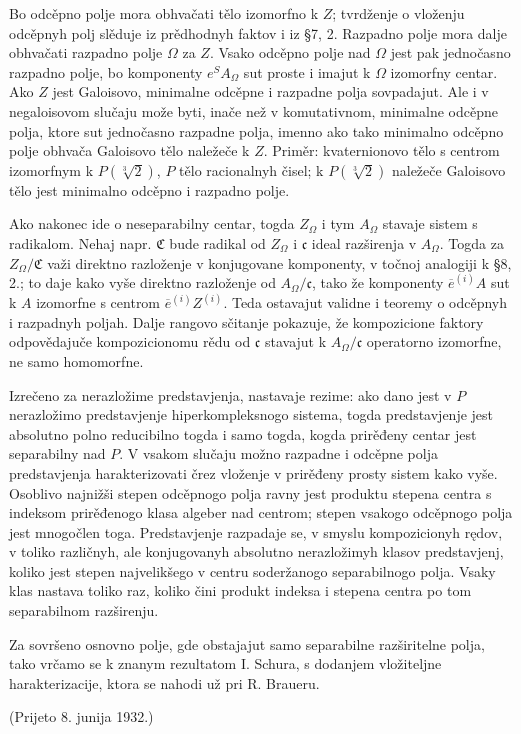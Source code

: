 \documentclass[11pt]{article}
\begin{document}
Bo odcěpno polje mora obhvačati tělo izomorfno k \(Z\); tvrdženje o vloženju odcěpnyh polj slěduje iz prědhodnyh faktov i iz §7, 2. Razpadno polje mora dalje obhvačati razpadno polje \(\Omega\) za \(Z\). Vsako odcěpno polje nad \(\Omega\) jest pak jednočasno razpadno polje, bo komponenty \(e^S A_\Omega\) sut proste i imajut k \(\Omega\) izomorfny centar. Ako \(Z\) jest Galoisovo, minimalne odcěpne i razpadne polja sovpadajut. Ale i v negaloisovom slučaju može byti, inače než v komutativnom, minimalne odcěpne polja, ktore sut jednočasno razpadne polja, imenno ako tako minimalno odcěpno polje obhvača Galoisovo tělo naležeče k \(Z\). Priměr: kvaternionovo tělo s centrom izomorfnym k \(P(\sqrt[3]{2})\), \(P\) tělo racionalnyh čisel; k \(P(\sqrt[3]{2})\) naležeče Galoisovo tělo jest minimalno odcěpno i razpadno polje.

Ako nakonec ide o neseparabilny centar, togda \(Z_\Omega\) i tym \(A_\Omega\) stavaje sistem s radikalom. Nehaj napr. \(\mathfrak C\) bude radikal od \(Z_\Omega\) i \(\mathfrak c\) ideal razširenja v \(A_\Omega\). Togda za \(Z_\Omega/\mathfrak C\) važi direktno razloženje v konjugovane komponenty, v točnoj analogiji k §8, 2.; to daje kako vyše direktno razloženje od \(A_\Omega/\mathfrak c\), tako že komponenty \(\overline e^{(i)}A\) sut k \(A\) izomorfne s centrom \(\overline e^{(i)}Z^{(i)}\). Teda ostavajut validne i teoremy o odcěpnyh i razpadnyh poljah. Dalje rangovo sčitanje pokazuje, že kompozicione faktory odpovědajuče kompozicionomu rědu od \(\mathfrak c\) stavajut k \(A_\Omega/\mathfrak c\) operatorno izomorfne, ne samo homomorfne.

Izrečeno za nerazložime predstavjenja, nastavaje rezime: ako dano jest v \(P\) nerazložimo predstavjenje hiperkompleksnogo sistema, togda predstavjenje jest absolutno polno reducibilno togda i samo togda, kogda prirěđeny centar jest separabilny nad \(P\). V vsakom slučaju možno razpadne i odcěpne polja predstavjenja harakterizovati črez vloženje v prirěđeny prosty sistem kako vyše. Osoblivo najnižši stepen odcěpnogo polja ravny jest produktu stepena centra s indeksom prirěđenogo klasa algeber nad centrom; stepen vsakogo odcěpnogo polja jest mnogočlen toga. Predstavjenje razpadaje se, v smyslu kompozicionyh rędov, v toliko različnyh, ale konjugovanyh absolutno nerazložimyh klasov predstavjenj, koliko jest stepen najvelikšego v centru soderžanogo separabilnogo polja. Vsaky klas nastava toliko raz, koliko čini produkt indeksa i stepena centra po tom separabilnom razširenju.

Za sovršeno osnovno polje, gde obstajajut samo separabilne razširitelne polja, tako vrčamo se k znanym rezultatom I. Schura, s dodanjem vložiteljne harakterizacije, ktora se nahodi už pri R. Braueru.

\begin{center}
(Prijeto 8. junija 1932.)
\end{center}
\end{document}
